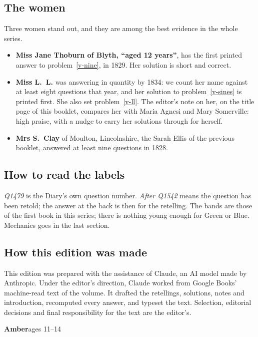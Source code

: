 \documentclass[11pt,a4paper]{article}
\newcounter{prob}
\newcommand{\band}[3]{%
  \clearpage
  \begin{tcolorbox}[colback=#1!12,colframe=#1,boxrule=1pt,arc=2pt]
  {\Large\bfseries\color{#1} #2}\hfill{\large #3}
  \end{tcolorbox}}
\begin{document}
\subsection*{The women}

Three women stand out, and they are among the best evidence in the whole series.
\begin{itemize}[leftmargin=*,itemsep=1pt]
\item \textbf{Miss Jane Thoburn of Blyth, ``aged 12 years''}, has the first printed
answer to problem~\ref{v-nine}, in 1829. Her solution is short and correct.
\item \textbf{Miss L.~L.} was answering in quantity by 1834: we count her name against at
least eight questions that year, and her solution to problem~\ref{v-sines} is printed
first. She also set problem~\ref{v-ll}. The editor's note on her, on the title page of
this booklet, compares her with Maria Agnesi and Mary Somerville: high praise, with a
nudge to carry her solutions through for herself.
\item \textbf{Mrs S.~Clay} of Moulton, Lincolnshire, the Sarah Ellis of the previous
booklet, answered at least nine questions in 1828.
\end{itemize}

\subsection*{How to read the labels}

\textit{Q1479} is the Diary's own question number. \textit{After Q1542} means the question
has been retold; the answer at the back is then for the retelling. The bands are those of
the first book in this series; there is nothing young enough for Green or Blue.
Mechanics goes in the last section.

\subsection*{How this edition was made}
This edition was prepared with the assistance of Claude, an AI model made by Anthropic.
Under the editor's direction, Claude worked from Google Books' machine-read text of the
volume. It drafted the retellings, solutions, notes and introduction, recomputed every
answer, and typeset the text. Selection, editorial decisions and final responsibility for
the text are the editor's.

\band{bandamber}{Amber}{ages 11--14}
\end{document}
